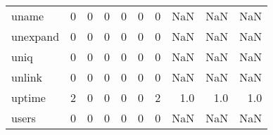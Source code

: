\begin{tabular}{lrrrrrrrrr}
uname     &                                       0 &                                                  0 &                                                  0 &                                                  0 &                                                  0 &                                                  0 &                                                NaN &                                    NaN &                                  NaN \\
unexpand  &                                       0 &                                                  0 &                                                  0 &                                                  0 &                                                  0 &                                                  0 &                                                NaN &                                    NaN &                                  NaN \\
uniq      &                                       0 &                                                  0 &                                                  0 &                                                  0 &                                                  0 &                                                  0 &                                                NaN &                                    NaN &                                  NaN \\
unlink    &                                       0 &                                                  0 &                                                  0 &                                                  0 &                                                  0 &                                                  0 &                                                NaN &                                    NaN &                                  NaN \\
uptime    &                                       2 &                                                  0 &                                                  0 &                                                  0 &                                                  0 &                                                  2 &                                                1.0 &                                    1.0 &                                  1.0 \\
users     &                                       0 &                                                  0 &                                                  0 &                                                  0 &                                                  0 &                                                  0 &                                                NaN &                                    NaN &                                  NaN \\

\end{tabular}
